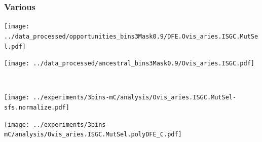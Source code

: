 \subsubsection{Various}

\begin{minipage}{0.49\linewidth}
    \texttt{[image: ../data\_processed/opportunities\_bins3Mask0.9/DFE.Ovis\_aries.ISGC.MutSel.pdf]}
\end{minipage}
\begin{minipage}{0.49\linewidth}
    \texttt{[image: ../data\_processed/ancestral\_bins3Mask0.9/Ovis\_aries.ISGC.pdf]}
\end{minipage}
\\
\begin{minipage}{0.49\linewidth}
    \texttt{[image: ../experiments/3bins-mC/analysis/Ovis\_aries.ISGC.MutSel-sfs.normalize.pdf]}
\end{minipage}
\begin{minipage}{0.4\linewidth}
    \texttt{[image: ../experiments/3bins-mC/analysis/Ovis\_aries.ISGC.MutSel.polyDFE\_C.pdf]}
\end{minipage}

